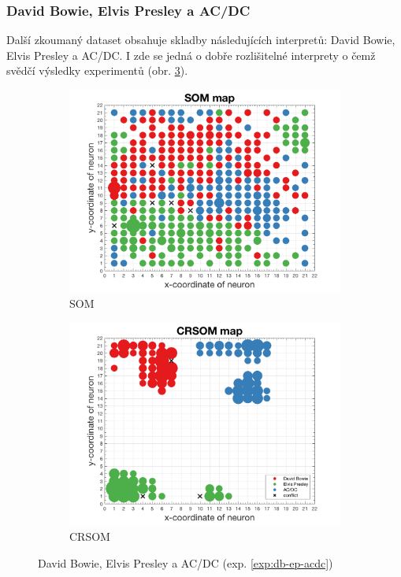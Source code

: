 \documentclass[thesis=M,czech]{FITthesis}[2012/06/26]
\begin{document}
\subsubsection*{David Bowie, Elvis Presley a AC/DC}
Další zkoumaný dataset obsahuje skladby následujících interpretů: David Bowie, Elvis Presley a AC/DC. I zde se jedná o dobře rozlišitelné interprety o čemž svědčí výsledky experimentů (obr. \ref{fig:db_ep_acdc}). 


\begin{figure}
\centering
\begin{subfigure}{.5\textwidth}
  \centering
  \includegraphics[width=.99\linewidth]{exp_db_ep_acdc_som.png}
  \caption{SOM}
  \label{fig:sub1}
\end{subfigure}%
\begin{subfigure}{.5\textwidth}
  \centering
  \includegraphics[width=.99\linewidth]{exp_db_ep_acdc_crsom.png}
  \caption{CRSOM}
  \label{fig:sub2}
\end{subfigure}
\caption{David Bowie, Elvis Presley a AC/DC (exp. \ref{exp:db-ep-acdc})}
\label{fig:db_ep_acdc}
\end{figure}
\end{document}
